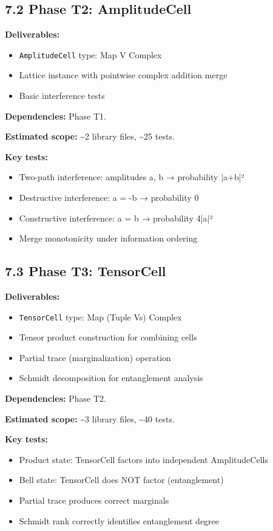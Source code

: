 \documentclass[11pt]{article}
\begin{document}
\subsection{7.2 Phase T2: AmplitudeCell}
\label{sec:org7446fc6}

\textbf{Deliverables:}
\begin{itemize}
\item \texttt{AmplitudeCell} type: Map V Complex
\item Lattice instance with pointwise complex addition merge
\item Basic interference tests
\end{itemize}

\textbf{Dependencies:} Phase T1.

\textbf{Estimated scope:} \textasciitilde{}2 library files, \textasciitilde{}25 tests.

\textbf{Key tests:}
\begin{itemize}
\item Two-path interference: amplitudes a, b → probability |a+b|²
\item Destructive interference: a = -b → probability 0
\item Constructive interference: a = b → probability 4|a|²
\item Merge monotonicity under information ordering
\end{itemize}
\subsection{7.3 Phase T3: TensorCell}
\label{sec:orgfa836d7}

\textbf{Deliverables:}
\begin{itemize}
\item \texttt{TensorCell} type: Map (Tuple Vs) Complex
\item Tensor product construction for combining cells
\item Partial trace (marginalization) operation
\item Schmidt decomposition for entanglement analysis
\end{itemize}

\textbf{Dependencies:} Phase T2.

\textbf{Estimated scope:} \textasciitilde{}3 library files, \textasciitilde{}40 tests.

\textbf{Key tests:}
\begin{itemize}
\item Product state: TensorCell factors into independent AmplitudeCells
\item Bell state: TensorCell does NOT factor (entanglement)
\item Partial trace produces correct marginals
\item Schmidt rank correctly identifies entanglement degree
\end{itemize}
\end{document}
